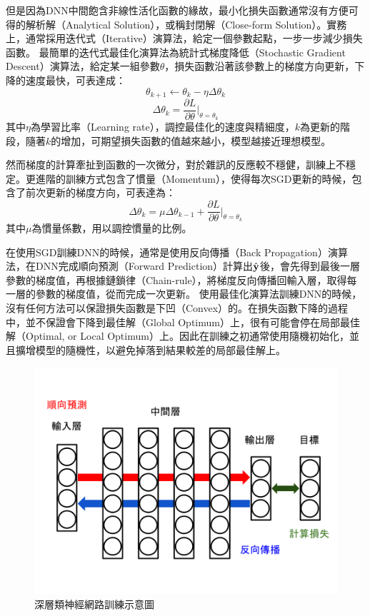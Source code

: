 但是因為DNN中間飽含非線性活化函數的緣故，最小化損失函數通常沒有方便可得的解析解（Analytical Solution），或稱封閉解（Close-form Solution）。實務上，通常採用迭代式（Iterative）演算法，給定一個參數起點，一步一步減少損失函數。
最簡單的迭代式最佳化演算法為統計式梯度降低（Stochastic Gradient Descent）演算法，給定某一組參數$\theta$，損失函數沿著該參數上的梯度方向更新，下降的速度最快，可表達成：
\begin{equation}
\theta_{k+1} \leftarrow \theta_k - \eta \Delta \theta_{k} 
\end{equation}
\begin{equation}
\Delta \theta_{k} = \frac{\partial L}{\partial \theta} \biggr|_{\theta = \theta_k}
\end{equation}
其中$\eta$為學習比率（Learning rate），調控最佳化的速度與精細度，$k$為更新的階段，隨著$k$的增加，可期望損失函數的值越來越小，模型越接近理想模型。

然而梯度的計算牽扯到函數的一次微分，對於雜訊的反應較不穩健，訓練上不穩定。更進階的訓練方式包含了慣量（Momentum），使得每次SGD更新的時候，包含了前次更新的梯度方向，可表達為：
\begin{equation}
\Delta \theta_{k} =  \mu \Delta \theta_{k-1} + \frac{\partial L}{\partial \theta} \biggr|_{\theta = \theta_k}
\end{equation}
其中$\mu$為慣量係數，用以調控慣量的比例。

在使用SGD訓練DNN的時候，通常是使用反向傳播（Back Propagation）演算法，在DNN完成順向預測（Forward Prediction）計算出$\hat{\bold{y}}$後，會先得到最後一層參數的梯度值，再根據鏈鎖律（Chain-rule），將梯度反向傳播回輸入層，取得每一層的參數的梯度值，從而完成一次更新。
使用最佳化演算法訓練DNN的時候，沒有任何方法可以保證損失函數是下凹（Convex）的。在損失函數下降的過程中，並不保證會下降到最佳解（Global Optimum）上，很有可能會停在局部最佳解（Optimal, or Local Optimum）上。因此在訓練之初通常使用隨機初始化，並且擴增模型的隨機性，以避免掉落到結果較差的局部最佳解上。

\begin{figure}
\centering
\includegraphics[scale=0.35]{images/chap2_dnn.png}
\caption{深層類神經網路訓練示意圖}
\label{fig:chap2_dnn}
\end{figure}

